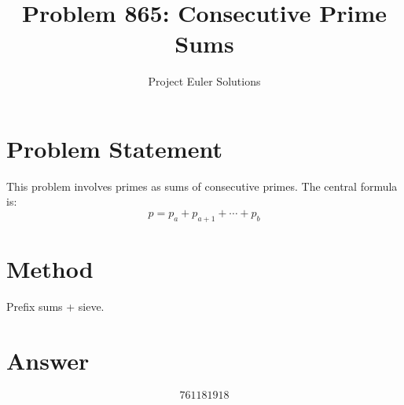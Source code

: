 \documentclass[11pt]{article}
\title{Problem 865: Consecutive Prime Sums}
\author{Project Euler Solutions}
\date{}
\begin{document}
\maketitle
\section{Problem Statement}
This problem involves primes as sums of consecutive primes. The central formula is:
\[
p = p_a + p_{a+1} + \cdots + p_b
\]
\section{Method}
Prefix sums + sieve.
\section{Answer}

\[
\boxed{761181918}
\]
\end{document}
